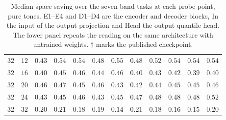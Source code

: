 \begin{table}[!tbp]
\begin{tabular}{@{}ccrrrrrrrrrr@{}}
        $32$ & $12$ & $0.43$ & $0.54$ & $0.54$ & $0.48$ & $0.55$ & $0.48$ & $0.52$ & $0.54$ & $0.54$ & $0.54$ \\
        $32$ & $16$ & $0.40$ & $0.45$ & $0.46$ & $0.44$ & $0.46$ & $0.40$ & $0.43$ & $0.42$ & $0.39$ & $0.40$ \\
        $32$ & $20$ & $0.46$ & $0.47$ & $0.45$ & $0.46$ & $0.43$ & $0.42$ & $0.44$ & $0.45$ & $0.45$ & $0.46$ \\
        $32$ & $24$ & $0.43$ & $0.45$ & $0.46$ & $0.43$ & $0.45$ & $0.47$ & $0.48$ & $0.48$ & $0.48$ & $0.52$ \\
        $32$ & $32$ & $0.20$ & $0.21$ & $0.18$ & $0.19$ & $0.14$ & $0.21$ & $0.18$ & $0.16$ & $0.15$ & $0.20$ \\
        \bottomrule
    \end{tabular}
    \caption{Median space saving over the seven band tasks at each probe point, pure tones. E1--E4 and D1--D4 are the encoder and decoder blocks, In the input of the output projection and Head the output quantile head. The lower panel repeats the reading on the same architecture with untrained weights. $\dagger$ marks the published checkpoint.}
    \label{tab:probingStages}
\end{table}
